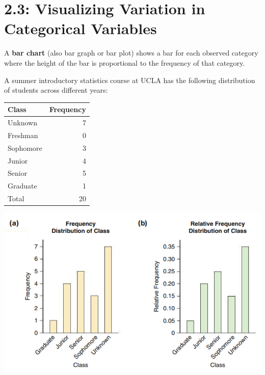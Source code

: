 \documentclass[../mathNotesPreamble]{subfiles}
\providecommand{\relscalefact}{1.4}
\begin{document}
\relscale{\relscalefact}
  \section{2.3: Visualizing Variation in Categorical Variables}
  \begin{defn*}
    A \textbf{bar chart} (also bar graph or bar plot) shows a bar for each observed category where the height of the bar is proportional to the frequency of that category.
  \end{defn*}
  \begin{ex*}
    A summer introductory statistics course at UCLA has the following distribution of students across different years:
  \end{ex*}

  \noindent
  \begin{minipage}{0.3\linewidth}
    \begin{center}
      \begin{tabular}{@{}lr@{}}\toprule
        Class& Frequency\\\midrule
        Unknown& 7\\
        Freshman& 0\\
        Sophomore& 3\\
        Junior& 4\\
        Senior& 5\\
        Graduate& 1\\\midrule
        Total& 20\\\bottomrule
      \end{tabular}
    \end{center}
  \end{minipage}%
  \begin{minipage}{0.625\linewidth}
    \includegraphics[width=\linewidth]{images/math211_figure_2p25}
  \end{minipage}
\end{document}
